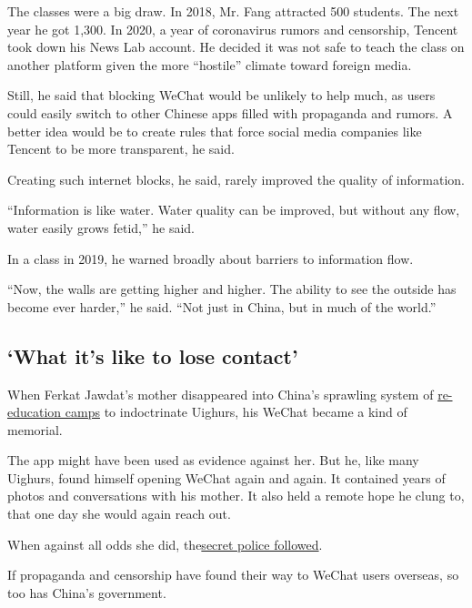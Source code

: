 The classes were a big draw. In 2018, Mr. Fang attracted 500 students.
The next year he got 1,300. In 2020, a year of coronavirus rumors and
censorship, Tencent took down his News Lab account. He decided it was
not safe to teach the class on another platform given the more
``hostile'' climate toward foreign media.

Still, he said that blocking WeChat would be unlikely to help much, as
users could easily switch to other Chinese apps filled with propaganda
and rumors. A better idea would be to create rules that force social
media companies like Tencent to be more transparent, he said.

Creating such internet blocks, he said, rarely improved the quality of
information.

``Information is like water. Water quality can be improved, but without
any flow, water easily grows fetid,'' he said.

In a class in 2019, he warned broadly about barriers to information
flow.

``Now, the walls are getting higher and higher. The ability to see the
outside has become ever harder,'' he said. ``Not just in China, but in
much of the world.''

\hypertarget{what-its-like-to-lose-contact}{%
\subsection{`What it's like to lose
contact'}\label{what-its-like-to-lose-contact}}

When Ferkat Jawdat's mother disappeared into China's sprawling system of
\href{https://www.nytimes3xbfgragh.onion/2018/09/08/world/asia/china-uighur-muslim-detention-camp.html}{re-education
camps} to indoctrinate Uighurs, his WeChat became a kind of memorial.

The app might have been used as evidence against her. But he, like many
Uighurs, found himself opening WeChat again and again. It contained
years of photos and conversations with his mother. It also held a remote
hope he clung to, that one day she would again reach out.

When against all odds she did,
the\href{https://www.nytimes3xbfgragh.onion/interactive/2019/04/04/world/asia/xinjiang-china-surveillance-prison.html}{secret
police followed}.

If propaganda and censorship have found their way to WeChat users
overseas, so too has China's government.

